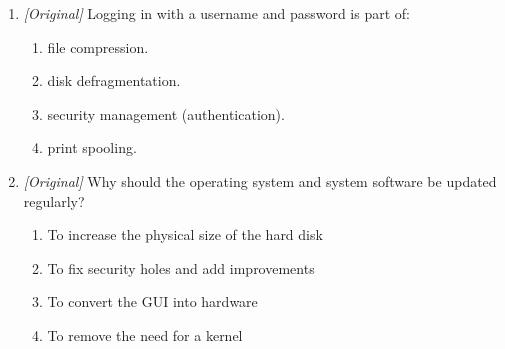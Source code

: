 \begin{enumerate}[label=\textbf{Q\arabic*.}, leftmargin=*]
\begin{enumerate}[label=\Alph*.]
  \end{enumerate}
\item \textit{[Original]} Logging in with a username and password is part of:
  \begin{enumerate}[label=\Alph*.]
    \item file compression.
    \item disk defragmentation.
    \item security management (authentication).
    \item print spooling.
  \end{enumerate}
\item \textit{[Original]} Why should the operating system and system software
  be updated regularly?
  \begin{enumerate}[label=\Alph*.]
    \item To increase the physical size of the hard disk
    \item To fix security holes and add improvements
    \item To convert the GUI into hardware
    \item To remove the need for a kernel
  \end{enumerate}


\end{enumerate}
